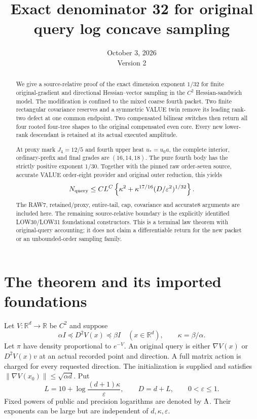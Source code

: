 \documentclass[11pt]{article}
\title{Exact denominator 32 for original query log concave sampling}
\author{}
\date{October 3, 2026\\Version 2}
\numberwithin{equation}{section}
\theoremstyle{remark}\newtheorem{remark}[theorem]{Remark}
\newcommand{\R}{\mathbb R}\newcommand{\E}{\mathbb E}
\newcommand{\norm}[1]{\lVert#1\rVert}
\begin{document}
\maketitle
\begin{abstract}
We give a source-relative proof of the exact dimension exponent $1/32$ for finite original-gradient and directional Hessian--vector sampling in the $C^2$ Hessian-sandwich model. The modification is confined to the mixed coarse fourth packet. Two finite rectangular covariance reserves and a symmetric VALUE twin remove its leading rank-two defect at one common endpoint. Two compensated bilinear switches then return all four rooted four-tree shapes to the original compensated even core. Every new lower-rank descendant is retained at its actual executed amplitude.

At proxy mark $J_4=12/5$ and fourth upper heat $u_*=u_0a$, the complete interior, ordinary-prefix and final grades are $(16,14,18)$. The pure fourth body has the strictly positive exponent $1/30$. Together with the pinned raw order-seven source, accurate VALUE order-eight provider and original outer reduction, this yields
\[
 N_{\rm query}\le C L^C\left\{\kappa^2+\kappa^{17/16}
                  (D/\varepsilon^2)^{1/32}\right\}.
\]
The RAW7, retained/proxy, entire-tail, cap, covariance and accurate8 arguments are included here. The remaining source-relative boundary is the explicitly identified LOW30/LOW31 foundational constructors. This is a terminal law theorem with original-query accounting; it does not claim a differentiable return for the new packet or an unbounded-order sampling family.
\end{abstract}
{\small\setlength{\parskip}{0pt}\tableofcontents}\clearpage

\section{The theorem and its imported foundations}
\label{sec:theorem}
Let $V:\R^d\to\R$ be $C^2$ and suppose
\[
 \alpha I\preceq D^2V(x)\preceq\beta I\quad(x\in\R^d),
 \qquad \kappa=\beta/\alpha.
\]
Let $\pi$ have density proportional to $e^{-V}$. An original query is either $\nabla V(x)$ or $D^2V(x)v$ at an actual recorded point and direction. A full matrix action is charged for every requested direction. The initialization is supplied and satisfies $\norm{\nabla V(x_0)}\le\sqrt{\alpha d}$. Put
\[
 L=10+\log\frac{(d+1)\kappa}{\varepsilon},\qquad D=d+L,
 \qquad 0<\varepsilon\le1.
\]
Fixed powers of public and precision logarithms are denoted by $\Lambda$. Their exponents can be large but are independent of $d,\kappa,\varepsilon$.
\end{document}

